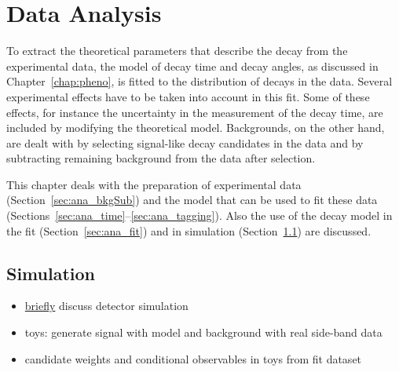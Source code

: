 \chapter{Data Analysis}
\label{chap:ana}

To extract the theoretical parameters that describe the \BstoJpsiKK{} decay from the experimental data, the model of decay time and decay
angles, as discussed in Chapter~\ref{chap:pheno}, is fitted to the distribution of decays in the data. Several experimental effects have to
be taken into account in this fit. Some of these effects, for instance the uncertainty in the measurement of the decay time, are included
by modifying the theoretical model. Backgrounds, on the other hand, are dealt with by selecting signal-like decay candidates in the data
and by subtracting remaining background from the data after selection.

This chapter deals with the preparation of experimental data (Section~\ref{sec:ana_bkgSub}) and the model that can be used to fit these
data (Sections~\ref{sec:ana_time}--\ref{sec:ana_tagging}). Also the use of the decay model in the fit (Section~\ref{sec:ana_fit}) and in
simulation (Section~\ref{sec:ana_sim}) are discussed.








\section{Simulation}
\label{sec:ana_sim}
\begin{itemize}
  \item \underline{briefly} discuss detector simulation
  \item toys: generate signal with model and background with real side-band data
  \item candidate weights and conditional observables in toys from fit dataset
\end{itemize}
